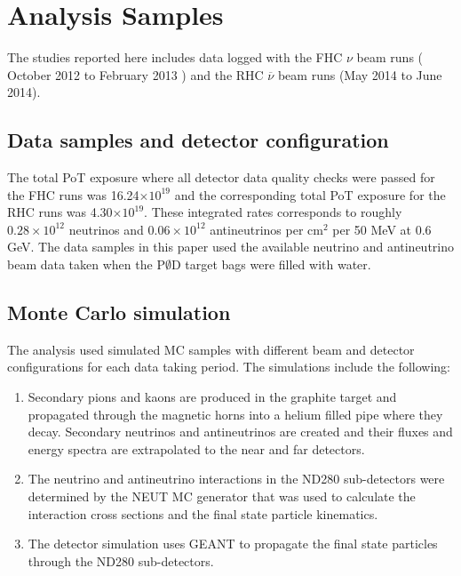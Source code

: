 \section{Analysis Samples}


The studies reported here includes data logged with 
the FHC $\nu$ beam runs (%
October 2012 to February 2013%
)
and the  RHC $\overline{\nu}$ beam runs
(May 2014 to June 2014).

\subsection{Data samples and detector configuration}
The total PoT exposure where all detector data quality checks were passed 
for the FHC runs was 16.24$\times10^{19}$ 
and the corresponding total PoT exposure for the RHC runs was 4.30$\times 10^{19}$.
These integrated rates corresponds to roughly
$0.28\times10^{12}$ neutrinos and $0.06\times10^{12}$ antineutrinos
per cm$^{2}$ per 50 MeV at 0.6 GeV. 
The data samples in this paper used the available neutrino and antineutrino beam 
data taken when the P$\emptyset$D target bags were filled with water.  

\subsection{Monte Carlo simulation}

The analysis used simulated MC
samples with different beam and detector configurations for each data taking period. 
The simulations include the following: %
\begin{enumerate}
\item
Secondary pions and kaons are produced in the graphite target and propagated through 
the magnetic horns into a helium filled pipe where 
they decay.  Secondary neutrinos and antineutrinos are created
and their fluxes and energy spectra 
are extrapolated to the near and far detectors.
\item
The neutrino and antineutrino interactions in the ND280 sub-detectors
were determined by the NEUT \citep{NEUT-1} MC generator 
that was used to calculate the interaction cross sections and 
the final state particle kinematics.
\item
The detector simulation uses GEANT to propagate the final state particles 
through the ND280 sub-detectors.
\end{enumerate}

